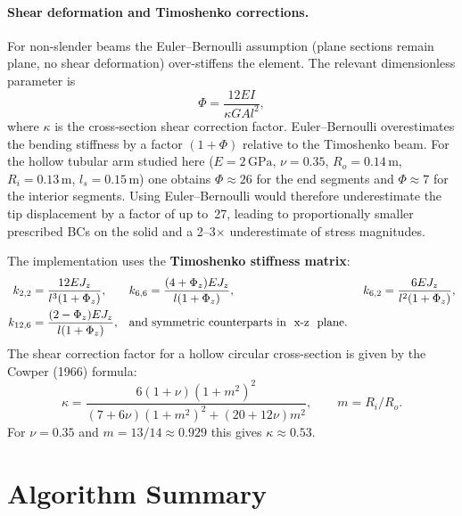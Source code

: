 \documentclass{article}
\begin{document}
\paragraph{Shear deformation and Timoshenko corrections.}
For non-slender beams the Euler--Bernoulli assumption (plane sections remain
plane, no shear deformation) over-stiffens the element.  The relevant
dimensionless parameter is
\begin{equation}
    \Phi = \frac{12 E I}{\kappa G A l^2},
\end{equation}
where $\kappa$ is the cross-section shear correction factor.  Euler--Bernoulli
overestimates the bending stiffness by a factor $(1+\Phi)$ relative to the
Timoshenko beam.  For the hollow tubular arm studied here
($E = 2\,\mathrm{GPa}$, $\nu = 0.35$, $R_o = 0.14\,\mathrm{m}$,
$R_i = 0.13\,\mathrm{m}$, $l_s = 0.15\,\mathrm{m}$) one obtains
$\Phi \approx 26$ for the end segments and $\Phi \approx 7$ for the interior
segments.  Using Euler--Bernoulli would therefore underestimate the tip
displacement by a factor of up to~27, leading to proportionally smaller
prescribed BCs on the solid and a 2--3$\times$ underestimate of stress
magnitudes.

The implementation uses the \textbf{Timoshenko stiffness matrix}:
\begin{align}
    k_{2,2} &= \frac{12 E J_z}{l^3(1+\Phi_z)}, &
    k_{6,6} &= \frac{(4+\Phi_z) E J_z}{l(1+\Phi_z)}, &
    k_{6,2} &= \frac{6 E J_z}{l^2(1+\Phi_z)}, \\
    k_{12,6} &= \frac{(2-\Phi_z) E J_z}{l(1+\Phi_z)}, &
    \multispan2{\text{and symmetric counterparts in } x\text{-}z \text{ plane.}}
\end{align}
The shear correction factor for a hollow circular cross-section is given by
the Cowper (1966) formula:
\begin{equation}
    \kappa = \frac{6(1+\nu)(1+m^2)^2}{(7+6\nu)(1+m^2)^2 + (20+12\nu)m^2},
    \qquad m = R_i/R_o.
\end{equation}
For $\nu = 0.35$ and $m = 13/14 \approx 0.929$ this gives $\kappa \approx 0.53$.

\section{Algorithm Summary}
\label{sec:algorithm}
\end{document}
